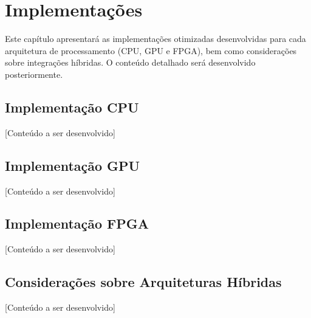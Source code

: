 \chapter{Implementações}\label{chp:implementacoes}

Este capítulo apresentará as implementações otimizadas desenvolvidas para cada arquitetura de processamento (CPU, GPU e FPGA), bem como considerações sobre integrações híbridas. O conteúdo detalhado será desenvolvido posteriormente.

\section{Implementação CPU}\label{sec:implementacao_cpu}

[Conteúdo a ser desenvolvido]

\section{Implementação GPU}\label{sec:implementacao_gpu}

[Conteúdo a ser desenvolvido]

\section{Implementação FPGA}\label{sec:implementacao_fpga}

[Conteúdo a ser desenvolvido]

\section{Considerações sobre Arquiteturas Híbridas}\label{sec:consideracoes_hibridas}

[Conteúdo a ser desenvolvido] 